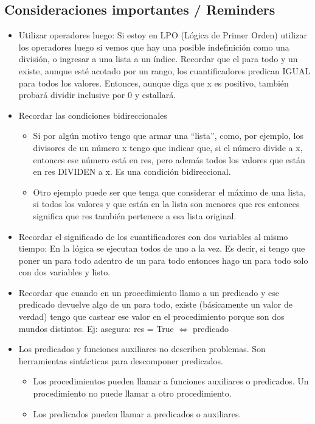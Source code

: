 \documentclass[10pt,a4paper]{article}
\begin{document}
\subsection*{Consideraciones importantes / Reminders}
\begin{itemize}
    \item Utilizar operadores luego: Si estoy en LPO (Lógica de Primer Orden) utilizar los operadores luego si vemos que hay una posible indefinición como una división, o ingresar a una lista a un índice. Recordar que el para todo y un existe, aunque esté acotado por un rango, los cuantificadores predican IGUAL para todos los valores. Entonces, aunque diga que x es positivo, también probará dividir inclusive por 0 y estallará.
    \item Recordar las condiciones bidireccionales
        \begin{itemize}
            \item Si por algún motivo tengo que armar una “lista”, como, por ejemplo, los divisores de un número x tengo que indicar que, si el número divide a x, entonces ese número está en res, pero además todos los valores que están en res DIVIDEN a x. Es una condición bidireccional. 
            \item Otro ejemplo puede ser que tenga que considerar el máximo de una lista, si todos los valores y que están en la lista son menores que res entonces significa que res también pertenece a esa lista original.
        \end{itemize}
    \item Recordar el significado de los cuantificadores con dos variables al mismo tiempo: En la lógica se ejecutan todos de uno a la vez. Es decir, si tengo que poner un para todo adentro de un para todo entonces hago un para todo solo con dos variables y listo.
    \item Recordar que cuando en un procedimiento llamo a un predicado y ese predicado devuelve algo de un para todo, existe (básicamente un valor de verdad) tengo que castear ese valor en el procedimiento porque son dos mundos distintos.
    Ej: asegura: { res = True \(\iff\) predicado}
    \item Los predicados y funciones auxiliares no describen problemas. Son herramientas sintácticas para descomponer predicados.
    \begin{itemize}
        \item Los procedimientos pueden llamar a funciones auxiliares o predicados. Un procedimiento no puede llamar a otro procedimiento.
        \item Los predicados pueden llamar a predicados o auxiliares. 

\end{itemize}
\end{itemize}
\end{document}
